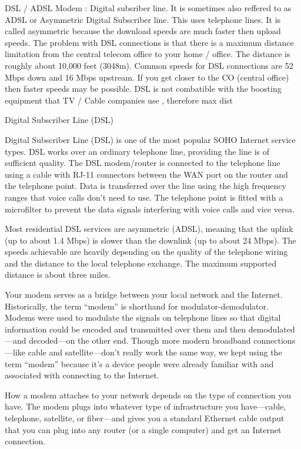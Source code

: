 DSL / ADSL Modem : Digital subsriber line. It is sometimes also reffered to as
ADSL or Asymmetric Digital Subscriber line. This uses telephone lines. It is
called asymmetric because the download speeds are much faster then upload
speeds. The problem with DSL connections is that there is a maximum distance
limitation from the central telecom office to your home / office. The distance
is roughly about 10,000 feet (3048m). Common speeds for DSL connections are 52
Mbps down and 16 Mbps upstream. If you get closer to the CO (central office)
then faster speeds may be possible. DSL is not combatible with the boosting
equipment that TV / Cable companies use , therefore max dist

Digital Subscriber Line (DSL)

Digital Subscriber Line (DSL) is one of the most popular SOHO Internet service
types. DSL works over an ordinary telephone line, providing the line is of
sufficient quality. The DSL modem/router is connected to the telephone line
using a cable with RJ-11 connectors between the WAN port on the router and the
telephone point. Data is transferred over the line using the high frequency
ranges that voice calls don't need to use. The telephone point is fitted with a
microfilter to prevent the data signals interfering with voice calls and vice
versa.

Most residential DSL services are asymmetric (ADSL), meaning that the uplink (up
to about 1.4 Mbps) is slower than the downlink (up to about 24 Mbps). The speeds
achievable are heavily depending on the quality of the telephone wiring and the
distance to the local telephone exchange. The maximum supported distance is
about three miles. 



Your modem serves as a bridge between your local network and the Internet.
Historically, the term “modem” is shorthand for modulator-demodulator. Modems
were used to modulate the signals on telephone lines so that digital information
could be encoded and transmitted over them and then demodulated—and decoded—on
the other end. Though more modern broadband connections—like cable and
satellite—don’t really work the same way, we kept using the term “modem” because
it’s a device people were already familiar with and associated with connecting
to the Internet.

How a modem attaches to your network depends on the type of connection you have.
The modem plugs into whatever type of infrastructure you have—cable, telephone,
satellite, or fiber—and gives you a standard Ethernet cable output that you can
plug into any router (or a single computer) and get an Internet connection.

